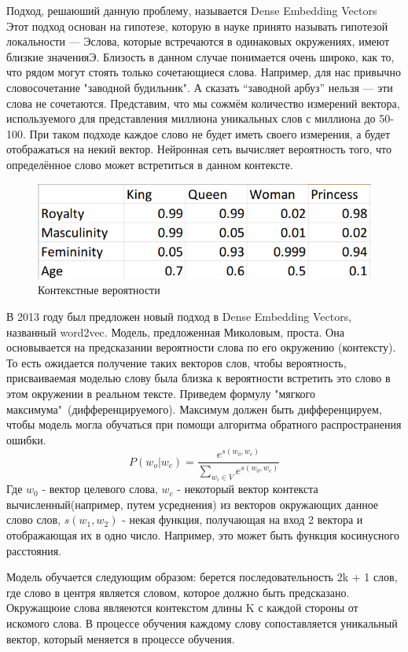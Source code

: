 Подход, решаюший данную проблему,  называется Dense Embedding Vectors
Этот подход основан на гипотезе, которую в науке принято называть гипотезой локальности — Эслова, которые встречаются в одинаковых окружениях, имеют близкие значенияЭ. Близость в данном случае понимается очень широко, как то, что рядом могут стоять только сочетающиеся слова. Например, для нас привычно словосочетание "заводной будильник". А сказать “заводной арбуз”  нельзя — эти слова не сочетаются.
Представим, что мы сожмём количество измерений вектора, используемого для представления миллиона уникальных слов с миллиона  до 50-100. При таком подходе каждое слово не будет иметь своего измерения, а будет отображаться на некий вектор.
Нейронная сеть вычисляет вероятность того, что определённое слово может встретиться в данном контексте.
\begin{figure}[!h]
	\centering
	\includegraphics[width=.5\textwidth]{master_img/dense_emb_example_edited.png}
	\caption{Контекстные вероятности}
	\label{fig06_master}
\end{figure}

В 2013 году был предложен новый подход в Dense Embedding Vectors, названный word2vec.
Модель, предложенная Миколовым\cite{Book28}, проста. Она основывается на  предсказании вероятности слова по его окружению (контексту). То есть ожидается получение таких векторов слов, чтобы вероятность, присваиваемая моделью слову была близка к вероятности встретить это слово в этом окружении в реальном тексте.
Приведем формулу "мягкого максимума"\ (дифференцируемого). Максимум должен быть дифференцируем, чтобы модель могла обучаться при помощи алгоритма обратного распространения ошибки.
\begin{equation}
P(w_o|w_c) = \frac{e^{s(w_0, w_c)}}{\sum_{w_i \in V}e^{s(w_0, w_c)}}
\end{equation}
Где $w_0$ - вектор целевого слова, $w_c$  - некоторый вектор контекста вычисленный(например, путем усреднения) из векторов окружающих данное слово слов, $s(w_1, w_2)$  - некая функция, получающая на вход 2 вектора и отображающая их в одно число. Например, это может быть функция косинусного расстояния.

Модель обучается следующим образом: берется последовательность 2k + 1 слов, где слово в центря является словом, которое должно быть предсказано. Окружащюие слова являеются контекстом длины K с каждой стороны от искомого слова. В процессе обучения каждому слову сопоставляется уникальный вектор, который меняется в процессе обучения.

